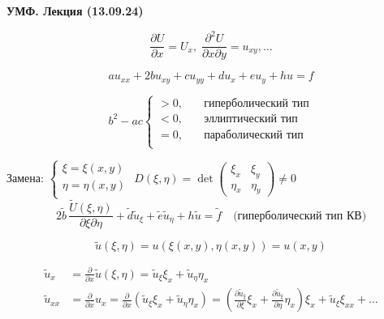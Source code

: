 \documentclass[a4paper]{article}
\begin{document}
\begin{center}
    \textbf{УМФ. Лекция (13.09.24)}\\ 
\end{center}

\[ 
    \frac{\partial U}{\partial x} = U_x, \; \frac{\partial^2U}{\partial x \partial y} 
    = u_{xy}, \dots
\] 

\begin{equation}
    au_{xx} + 2bu_{xy} + cu_{yy} + du_x + eu_y + hu = f
\end{equation}

\[ 
    b^2 - ac \begin{cases}
        > 0, \quad & \text{гиперболический тип} \\
        < 0, \quad & \text{эллиптический тип} \\
        = 0, \quad & \text{параболический тип} \\
        
    \end{cases}
\]

Замена: 
$
\begin{cases}
    \xi = \xi(x,y) \\
    \eta = \eta(x, y) \\
\end{cases}
$
\hspace{1cm}
$ D(\xi, \eta) = \det
\begin{pmatrix}
    \xi_x & \xi_y \\
    \eta_x & \eta_y
\end{pmatrix}
\neq 0
$
\begin{equation}
    2\tilde{b}\, \frac{\tilde{U}(\xi, \eta)}{\partial\xi\partial\eta}
    + \tilde{d} \tilde{u}_\xi + \tilde{e} \tilde{u}_\eta + h
    \tilde{u} = \tilde{f}
    \quad\text{(гиперболический тип КВ)}
\end{equation}

\begin{equation}
    \tilde{u}(\xi, \eta) = u\left(\xi(x,y), \eta(x,y)\right) = u(x,y)
\end{equation}

\begin{align*}
    \tilde{u}_x &= \frac{\partial}{\partial x} \tilde{u}(\xi, \eta) =
    \tilde{u}_\xi \xi_x + \tilde{u}_\eta \eta_x \\
    \tilde{u}_{xx} &= \frac{\partial}{\partial x} u_x = 
    \frac{\partial}{\partial x} (\tilde{u}_\xi \xi_x + \tilde{u}_\eta \eta_x) =  
    (\frac{\partial\tilde{u}_\xi}{\partial \xi} \xi_x + \frac{\partial\tilde{u}_\xi}
    {\partial \eta} \eta_x) \xi_x + \tilde{u}_\xi \xi_{xx} + \dots
\end{align*}
\end{document}
